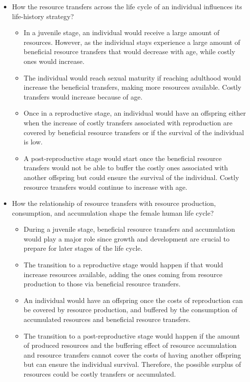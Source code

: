 \documentclass{article}
\begin{document}
\begin{itemize}
    \item How the resource transfers across the life cycle of an individual influences its life-history strategy?
    \begin{itemize}
        \item In a juvenile stage, an individual would receive a large amount of resources. However, as the individual stays experience a large amount of beneficial resource transfers that would decrease with age, while costly ones would increase.
        \item The individual would reach sexual maturity if reaching adulthood would increase the beneficial transfers, making more resources available. Costly transfers would increase because of age.
        \item Once in a reproductive stage, an individual would have an offspring either when the increase of costly transfers associated with reproduction are covered by beneficial resource transfers or if the survival of the individual is low.
        \item A post-reproductive stage would start once the beneficial resource transfers would not be able to buffer the costly ones associated with another offspring but could ensure the survival of the individual. Costly resource transfers would continue to increase with age.
    \end{itemize}
\item How the relationship of resource transfers with resource production, consumption, and accumulation shape the female human life cycle?
    \begin{itemize}
        \item During a juvenile stage, beneficial resource transfers and accumulation would play a major role since growth and development are crucial to prepare for later stages of the life cycle.
        \item The transition to a reproductive stage would happen if that would increase resources available, adding the ones coming from resource production to those via beneficial resource transfers.
        \item An individual would have an offspring once the costs of reproduction can be covered by resource production, and buffered by the consumption of accumulated resources and beneficial resource transfers.
        \item The transition to a post-reproductive stage would happen if the amount of produced resources and the buffering effect of resource accumulation and resource transfers cannot cover the costs of having another offspring but can ensure the individual survival. Therefore, the possible surplus of resources could be costly transfers or accumulated.

\end{itemize}
\end{itemize}
\end{document}

